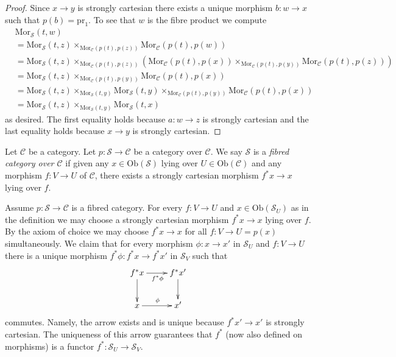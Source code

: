 \begin{proof}
Since $x \to y$ is strongly cartesian there exists a unique morphism
$b : w \to x$ such that $p(b) = \text{pr}_1$. To see that $w$ is the
fibre product we compute
\begin{align*}
& \text{Mor}_\mathcal{S}(t, w) \\
& = \text{Mor}_\mathcal{S}(t, z)
\times_{\text{Mor}_\mathcal{C}(p(t), p(z))}
\text{Mor}_\mathcal{C}(p(t), p(w)) \\
& = \text{Mor}_\mathcal{S}(t, z)
\times_{\text{Mor}_\mathcal{C}(p(t), p(z))}
(\text{Mor}_\mathcal{C}(p(t), p(x))
\times_{\text{Mor}_\mathcal{C}(p(t), p(y))}
\text{Mor}_\mathcal{C}(p(t), p(z))) \\
& = \text{Mor}_\mathcal{S}(t, z)
\times_{\text{Mor}_\mathcal{C}(p(t), p(y))}
\text{Mor}_\mathcal{C}(p(t), p(x)) \\
& = \text{Mor}_\mathcal{S}(t, z)
\times_{\text{Mor}_\mathcal{S}(t, y)}
\text{Mor}_\mathcal{S}(t, y)
\times_{\text{Mor}_\mathcal{C}(p(t), p(y))}
\text{Mor}_\mathcal{C}(p(t), p(x)) \\
& = \text{Mor}_\mathcal{S}(t, z)
\times_{\text{Mor}_\mathcal{S}(t, y)}
\text{Mor}_\mathcal{S}(t, x)
\end{align*}
as desired. The first equality holds because $a : w \to z$ is strongly
cartesian and the last equality holds because $x \to y$ is strongly
cartesian.
\end{proof}

\begin{definition}
\label{definition-fibred-category}
Let $\mathcal{C}$ be a category.
Let $p : \mathcal{S} \to \mathcal{C}$ be a category over $\mathcal{C}$.
We say $\mathcal{S}$ is a {\it fibred category over $\mathcal{C}$}
if given any $x \in \text{Ob}(\mathcal{S})$ lying over
$U \in \text{Ob}(\mathcal{C})$ and any morphism $f : V \to U$ of
$\mathcal{C}$, there exists a strongly cartesian morphism $f^*x \to x$
lying over $f$.
\end{definition}

\noindent
Assume $p : \mathcal{S} \to \mathcal{C}$ is a fibred category.
For every $f : V \to U$ and $x\in \text{Ob}(\mathcal{S}_U)$
as in the definition we may choose a strongly cartesian morphism
$f^\ast x \to x$ lying over $f$. By the axiom of choice we may choose
$f^*x \to x$ for all $f: V \to U = p(x)$ simultaneously.
We claim that for every morphism $\phi : x \to x'$ in $\mathcal{S}_U$
and $f : V \to U$ there is a unique
morphism $f^\ast \phi : f^\ast x \to f^\ast x'$ in $\mathcal{S}_V$
such that
$$
\xymatrix{
f^\ast x \ar[r]_{f^\ast \phi} \ar[d] & f^\ast x' \ar[d] \\
x \ar[r]^{\phi} & x' }
$$
commutes. Namely, the arrow exists and is unique because $f^*x' \to x'$ is
strongly cartesian. The uniqueness of this arrow guarantees that
$f^\ast$ (now also defined on morphisms) is a
functor $ f^\ast : \mathcal{S}_U \to \mathcal{S}_V$.

